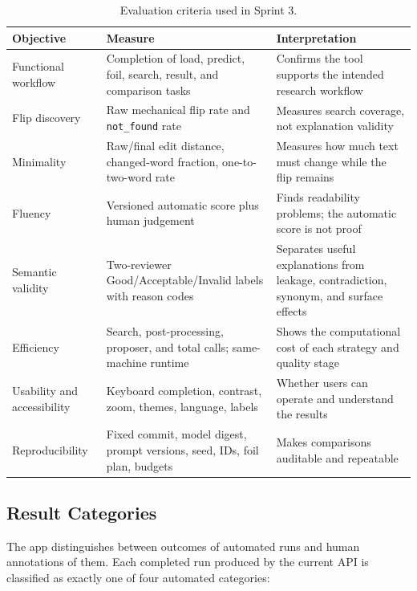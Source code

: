 \documentclass[11pt,a4paper]{article}
\begin{document}
\begin{table}[htbp]
\centering
\small
\begin{tabularx}{\textwidth}{@{}L{2.7cm}Y Y@{}}
\toprule
\textbf{Objective} & \textbf{Measure} & \textbf{Interpretation} \\
\midrule
Functional workflow & Completion of load, predict, foil, search, result, and comparison tasks & Confirms the tool supports the intended research workflow \\
Flip discovery & Raw mechanical flip rate and \texttt{not\_found} rate & Measures search coverage, not explanation validity \\
Minimality & Raw/final edit distance, changed-word fraction, one-to-two-word rate & Measures how much text must change while the flip remains \\
Fluency & Versioned automatic score plus human judgement & Finds readability problems; the automatic score is not proof \\
Semantic validity & Two-reviewer Good/Acceptable/Invalid labels with reason codes & Separates useful explanations from leakage, contradiction, synonym, and surface effects \\
Efficiency & Search, post-processing, proposer, and total calls; same-machine runtime & Shows the computational cost of each strategy and quality stage \\
Usability and accessibility & Keyboard completion, contrast, zoom, themes, language, labels & Whether users can operate and understand the results \\
Reproducibility & Fixed commit, model digest, prompt versions, seed, IDs, foil plan, budgets & Makes comparisons auditable and repeatable \\
\bottomrule
\end{tabularx}
\caption{Evaluation criteria used in Sprint 3.}
\label{tab:criteria}
\end{table}

\subsection{Result Categories}

The app distinguishes between outcomes of automated runs and human annotations of
them. Each completed run produced by the current API is classified as exactly one of
four automated categories:
\end{document}
